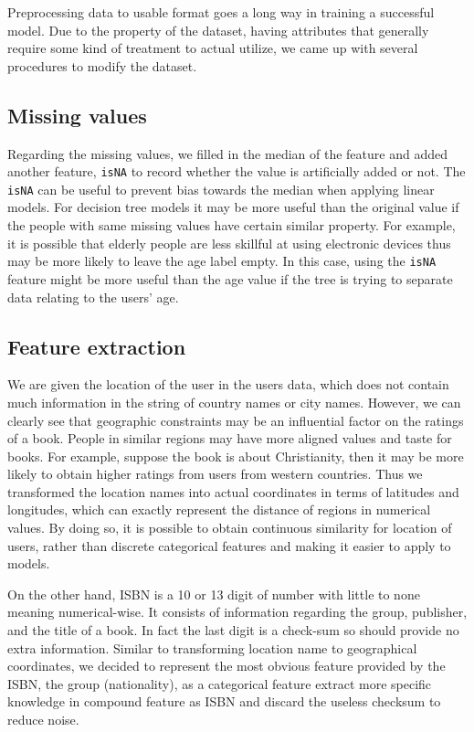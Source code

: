 \documentclass{article}
\begin{document}
Preprocessing data to usable format goes a long way in training a successful model. Due to the property of the dataset, having attributes that generally require some kind of treatment to actual utilize, we came up with several procedures to modify the dataset.


\subsection*{Missing values}
Regarding the missing values, we filled in the median of the feature and added another feature, \texttt{isNA} to record whether the value is artificially added or not. The \texttt{isNA} can be useful to prevent bias towards the median when applying linear models. For decision tree models it may be more useful than the original value if the people with same missing values have certain similar property. For example, it is possible that elderly people are less skillful at using electronic devices thus may be more likely to leave the age label empty. In this case, using the \texttt{isNA} feature might be more useful than the age value if the tree is trying to separate data relating to the users' age.

\subsection*{Feature extraction}
We are given the location of the user in the users data, which does not contain much information in the string of country names or city names. However, we can clearly see that geographic constraints may be an influential factor on the ratings of a book. People in similar regions may have more aligned values and taste for books. For example, suppose the book is about Christianity, then it may be more likely to obtain higher ratings from users from western countries. Thus we transformed the location names into actual coordinates in terms of latitudes and longitudes, which can exactly represent the distance of regions in numerical values. By doing so, it is possible to obtain continuous similarity for location of users, rather than discrete categorical features and making it easier to apply to models.


On the other hand, ISBN is a 10 or 13 digit of number with little to none meaning numerical-wise. It consists of information regarding the group, publisher, and the title of a book. In fact the last digit is a check-sum so should provide no extra information. Similar to transforming location name to geographical coordinates, we decided to represent the most obvious feature provided by the ISBN, the group (nationality), as a categorical feature extract more specific knowledge in compound feature as ISBN and discard the useless checksum to reduce noise.
\end{document}
